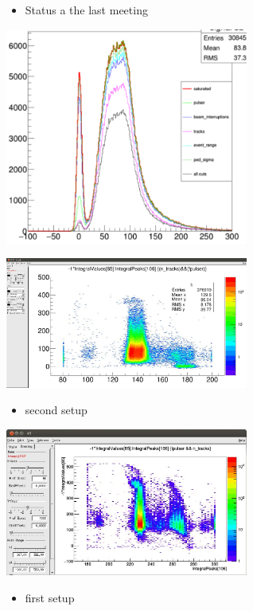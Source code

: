 \documentclass[9pt]{beamer}
\begin{document}
\begin{frame}
	\begin{itemize}
		\item Status a the last meeting
	\end{itemize}
	\begin{center}
		\includegraphics[width=8cm]{Pics/oldcuts}
	\end{center}
\end{frame}
\begin{frame}
	\begin{center}
		\includegraphics[width=8cm]{Pics/Buckets1}
	\end{center}
	\begin{itemize}
		\item second setup
	\end{itemize}
\end{frame}
\begin{frame}
	\begin{center}
		\includegraphics[width=8cm]{Pics/Buckets2}
	\end{center}
	\begin{itemize}
		\item first setup
	\end{itemize}
\end{frame}
\end{document}
